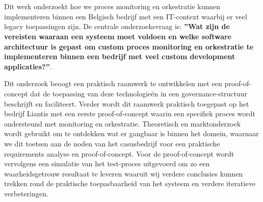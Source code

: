 

\chapter*{}

Dit werk onderzoekt hoe we proces monitoring en orkestratie kunnen implementeren binnen een Belgisch bedrijf met een IT-context waarbij er veel legacy toepassingen zijn. De centrale onderzoeksvraag is: \textbf{”Wat zijn de vereisten waaraan een systeem moet voldoen en welke software architectuur is gepast om custom proces monitoring en orkestratie te implementeren binnen een bedrijf met veel custom development applicaties?”}.\newline

Dit onderzoek beoogt een praktisch raamwerk te ontwikkelen met een proof-of-concept dat de toepassing van deze technologieën in een governance-structuur beschrijft en faciliteert. Verder wordt dit raamwerk praktisch toegepast op het bedrijf Liantis met een eerste proof-of-concept waarin een specifiek proces wordt ondersteund met monitoring en orkestratie. Theoretisch en marktonderzoek wordt gebruikt om te ontdekken wat er gangbaar is binnen het domein, waarnaar we dit toetsen aan de noden van het casusbedrijf voor een praktische requirements analyse en proof-of-concept. Voor de proof-of-concept wordt vervolgens een simulatie van het test-proces uitgevoerd om zo een waarheidsgetrouw resultaat te leveren waaruit wij verdere conclusies kunnen trekken rond de praktische toepasbaarheid van het systeem en verdere iteratieve verbeteringen.
